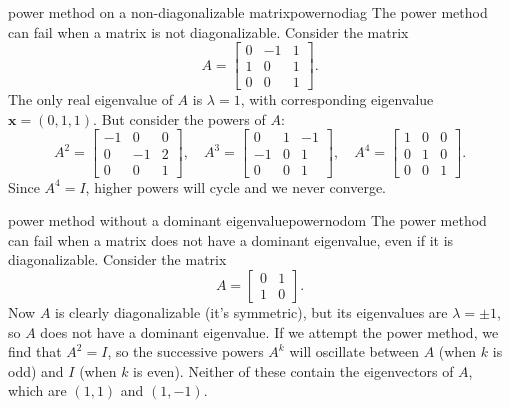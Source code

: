 \documentclass{article}
\let\vec\mathbf
\begin{document}
\begin{example}{power method on a non-diagonalizable matrix}{powernodiag}
  The power method can fail when a matrix is not diagonalizable. Consider the matrix
  \begin{equation*}
    A = \begin{bmatrix}0 & -1 & 1 \\ 1 & 0 & 1 \\ 0 & 0 & 1\end{bmatrix}.
  \end{equation*}
  The only real eigenvalue of $A$ is $\lambda = 1$, with corresponding eigenvalue $\vec{x} = (0,1,1)$. But consider the powers of $A$:
  \begin{equation*}
    A^2 = \begin{bmatrix}-1 & 0 & 0 \\ 0 & -1 & 2 \\ 0 & 0 & 1\end{bmatrix},\quad
    A^3 = \begin{bmatrix}0 & 1 & -1 \\ -1 & 0 & 1 \\ 0 & 0 & 1\end{bmatrix},\quad
    A^4 = \begin{bmatrix}1 & 0 & 0 \\ 0 & 1 & 0 \\ 0 & 0 & 1\end{bmatrix}.
  \end{equation*}
  Since $A^4 = I$, higher powers will cycle and we never converge.
\end{example}

\begin{example}{power method without a dominant eigenvalue}{powernodom}
  The power method can fail when a matrix does not have a dominant eigenvalue, even if it is diagonalizable. Consider the matrix
  \begin{equation*}
    A = \begin{bmatrix}0 & 1 \\ 1 & 0\end{bmatrix}.
  \end{equation*}
  Now $A$ is clearly diagonalizable (it's symmetric), but its eigenvalues are $\lambda = \pm 1$, so $A$ does not have a dominant eigenvalue. If we attempt the power method, we find that $A^2 = I$, so the successive powers $A^k$ will oscillate between $A$ (when $k$ is odd) and $I$ (when $k$ is even). Neither of these contain the eigenvectors of $A$, which are $(1,1)$ and $(1,-1)$.
\end{example}
\end{document}
